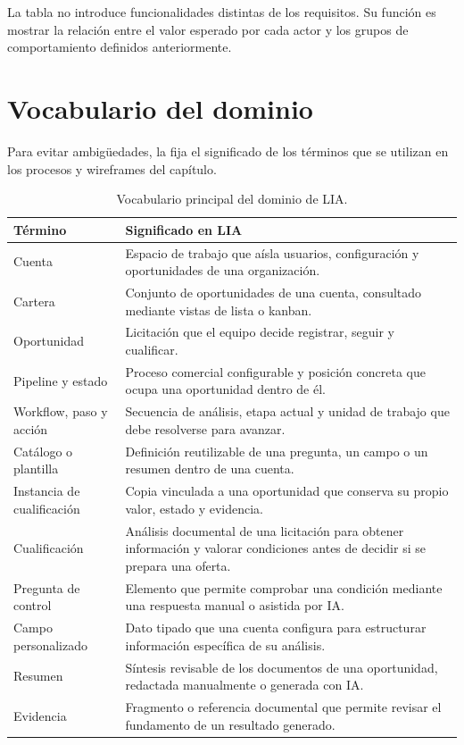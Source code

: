 La tabla no introduce funcionalidades distintas de los requisitos. Su función
es mostrar la relación entre el valor esperado por cada actor y los grupos de
comportamiento definidos anteriormente.

\section{Vocabulario del dominio}

Para evitar ambigüedades, la  fija el significado
de los términos que se utilizan en los procesos y wireframes del capítulo.

\begin{table}[H]
  \centering
  \small
  \caption{Vocabulario principal del dominio de LIA.}
  \label{tab:domain-vocabulary}
  \begin{tabular}{@{}p{3.4cm}p{10cm}@{}}
    \toprule
    \textbf{Término} & \textbf{Significado en LIA} \\
    \midrule
    Cuenta & Espacio de trabajo que aísla usuarios, configuración y oportunidades de una organización. \\
    Cartera & Conjunto de oportunidades de una cuenta, consultado mediante vistas de lista o kanban. \\
    Oportunidad & Licitación que el equipo decide registrar, seguir y cualificar. \\
    Pipeline y estado & Proceso comercial configurable y posición concreta que ocupa una oportunidad dentro de él. \\
    Workflow, paso y acción & Secuencia de análisis, etapa actual y unidad de trabajo que debe resolverse para avanzar. \\
    Catálogo o plantilla & Definición reutilizable de una pregunta, un campo o un resumen dentro de una cuenta. \\
    Instancia de cualificación & Copia vinculada a una oportunidad que conserva su propio valor, estado y evidencia. \\
    Cualificación & Análisis documental de una licitación para obtener información y valorar condiciones antes de decidir si se prepara una oferta. \\
    Pregunta de control & Elemento que permite comprobar una condición mediante una respuesta manual o asistida por IA. \\
    Campo personalizado & Dato tipado que una cuenta configura para estructurar información específica de su análisis. \\
    Resumen & Síntesis revisable de los documentos de una oportunidad, redactada manualmente o generada con IA. \\
    Evidencia & Fragmento o referencia documental que permite revisar el fundamento de un resultado generado. \\
    \bottomrule
  \end{tabular}
\end{table}

